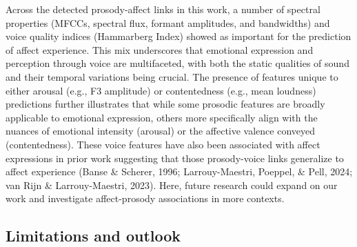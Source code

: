 \documentclass[
  english,
  man,floatsintext]{apa6}
\begin{document}
Across the detected prosody-affect links in this work, a number of spectral properties (MFCCs, spectral flux, formant amplitudes, and bandwidths) and voice quality indices (Hammarberg Index) showed as important for the prediction of affect experience. This mix underscores that emotional expression and perception through voice are multifaceted, with both the static qualities of sound and their temporal variations being crucial. The presence of features unique to either arousal (e.g., F3 amplitude) or contentedness (e.g., mean loudness) predictions further illustrates that while some prosodic features are broadly applicable to emotional expression, others more specifically align with the nuances of emotional intensity (arousal) or the affective valence conveyed (contentedness). These voice features have also been associated with affect expressions in prior work suggesting that those prosody-voice links generalize to affect experience (Banse \& Scherer, 1996; Larrouy-Maestri, Poeppel, \& Pell, 2024; van Rijn \& Larrouy-Maestri, 2023). Here, future research could expand on our work and investigate affect-prosody associations in more contexts.

\hypertarget{limitations-and-outlook}{%
\subsection{Limitations and outlook}\label{limitations-and-outlook}}
\end{document}
